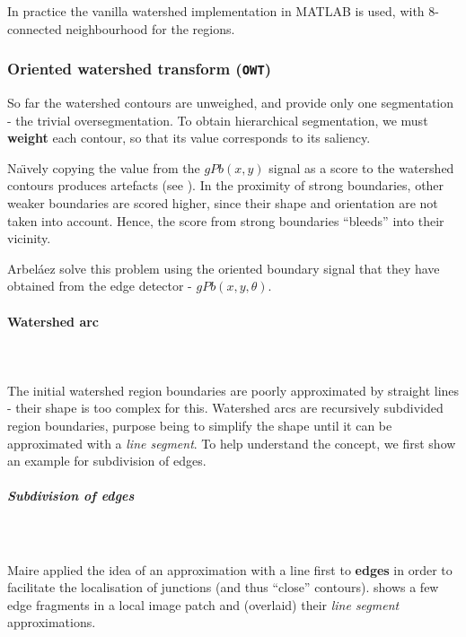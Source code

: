 In practice the vanilla watershed implementation in MATLAB \cite{MATLABwatershed} is used, with 8-connected neighbourhood for the regions.

\subsubsection{Oriented watershed transform ({\tt OWT})}
\label{sec:ch3-OWT}
So far %
the watershed contours are unweighed, and provide only one segmentation - the trivial oversegmentation. To obtain hierarchical segmentation, we must {\bf weight} each contour, so that its value corresponds to its saliency. %

Na\"{\i}vely copying the value from the $gPb(x,y)$ signal as a score to the watershed contours produces artefacts (see ). In the proximity of strong boundaries, other weaker boundaries are scored higher, since their shape and orientation are not taken into account. Hence, the score from strong boundaries ``bleeds'' into their vicinity.

Arbel\'aez \etal solve this problem using the oriented boundary signal that they have obtained from the edge detector - $gPb(x,y,\theta)$. 

\paragraph{Watershed arc}\mbox{}\\\mbox{}\\
\label{par:ch3-watershed-arc}
The initial watershed region boundaries are poorly approximated by straight lines - their shape is too complex for this. 
Watershed arcs are recursively subdivided region boundaries, purpose being to simplify the shape until it can be approximated with a {\it line segment}. To help understand the concept, we first show an example for subdivision of edges.

\subparagraph{Subdivision of edges}\mbox{}\\\mbox{}\\
Maire \etal \cite{Maire2008using} applied the idea of an approximation %
with a line first to {\bf edges} in order to facilitate the localisation of junctions (and thus ``close'' contours).  shows a few edge fragments in a local image patch and (overlaid) their {\it line segment} approximations.

